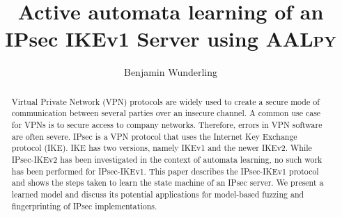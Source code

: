 \documentclass[runningheads]{llncs}
\begin{document}
%
\title{Active automata learning of an IPsec IKEv1 Server using \textsc{AALpy}}
%
%
\author{Benjamin Wunderling}

%
%
%
\maketitle              %
%
\begin{abstract}
Virtual Private Network (VPN) protocols are widely used to create a secure mode of communication between several parties over an insecure channel. A common use case for VPNs is to secure access to company networks. Therefore, errors in VPN software are often severe. IPsec is a VPN protocol that uses the Internet Key Exchange protocol (IKE). IKE has two versions, namely IKEv1 and the newer IKEv2. While IPsec-IKEv2 has been investigated in the context of automata learning, no such work has been performed for IPsec-IKEv1. This paper describes the IPsec-IKEv1 protocol and shows the steps taken to learn the state machine of an IPsec server. We present a learned model and discuss its potential applications for model-based fuzzing and fingerprinting of IPsec implementations.

\end{abstract}
%
%
%
\end{document}
